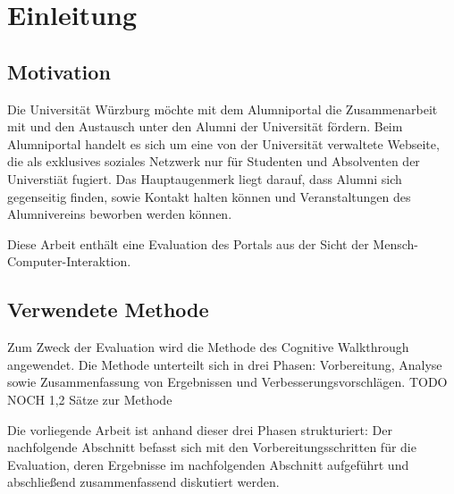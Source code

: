\section{Einleitung}
\subsection{Motivation}
Die Universität Würzburg möchte mit dem Alumniportal die Zusammenarbeit mit und den Austausch unter den Alumni der Universität fördern. 
Beim Alumniportal handelt es sich um eine von der Universität verwaltete Webseite, die als exklusives soziales Netzwerk nur für Studenten und Absolventen der Universtiät fugiert. 
Das Hauptaugenmerk liegt darauf, dass Alumni sich gegenseitig finden, sowie Kontakt halten können und Veranstaltungen des Alumnivereins beworben werden können. 

Diese Arbeit enthält eine Evaluation des Portals aus der Sicht der Mensch-Computer-Interaktion. 

\subsection{Verwendete Methode}
Zum Zweck der Evaluation wird die Methode des Cognitive Walkthrough angewendet.
Die Methode unterteilt sich in drei Phasen: Vorbereitung, Analyse sowie Zusammenfassung von Ergebnissen und Verbesserungsvorschlägen. 
TODO NOCH 1,2 Sätze zur Methode

Die vorliegende Arbeit ist anhand dieser drei Phasen strukturiert: Der nachfolgende Abschnitt befasst sich mit den Vorbereitungsschritten für die Evaluation, deren Ergebnisse im nachfolgenden Abschnitt aufgeführt und abschließend zusammenfassend diskutiert werden.